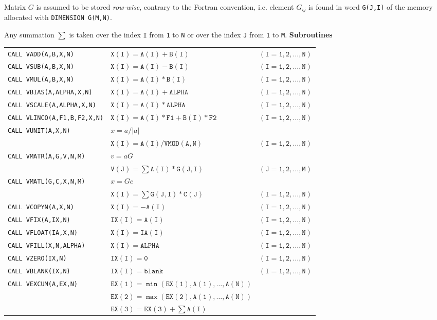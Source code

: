 Matrix $G$ is assumed to be stored {\it row-wise},
contrary to the Fortran convention, i.e. element $G_{ij}$ is
found in word {\tt G(J,I)} of the memory allocated with
{\tt DIMENSION G(M,N)}.
\par
Any summation $\sum$ is taken
over the index {\tt I} from {\tt 1} to {\tt N} or
over the index {\tt J} from {\tt 1} to {\tt M}.
\newpage
{\bf Subroutines} \\[3mm]
\begin{tabular}{@{\hspace*{10mm}}lll}
{\tt CALL VADD(A,B,X,N)}             & $\mathtt{X(I)=A(I)+B(I)}$
& $\mathtt{(I=1,2,\ldots,N)}$ \\
{\tt CALL VSUB(A,B,X,N)}             & $\mathtt{X(I)=A(I)-B(I)}$
& $\mathtt{(I=1,2,\ldots,N)}$ \\
{\tt CALL VMUL(A,B,X,N)}             & $\mathtt{X(I)=A(I)*B(I)}$
& $\mathtt{(I=1,2,\ldots,N)}$ \\
{\tt CALL VBIAS(A,ALPHA,X,N)}         & $\mathtt{X(I)=A(I)+ALPHA}$
& $\mathtt{(I=1,2,\ldots,N)}$ \\
{\tt CALL VSCALE(A,ALPHA,X,N)}         & $\mathtt{X(I)=A(I)*ALPHA}$
& $\mathtt{(I=1,2,\ldots,N)}$ \\
{\tt CALL VLINCO(A,F1,B,F2,X,N)} & $\mathtt{X(I)=A(I)*F1+B(I)*F2}$
& $\mathtt{(I=1,2,\ldots,N)}$ \\
{\tt CALL VUNIT(A,X,N)}               & $x = a / |a|$ \\
                                      & $\mathtt{X(I)=A(I)/VMOD(A,N)}$
& $\mathtt{(I=1,2,\ldots,N)}$ \\
{\tt CALL VMATR(A,G,V,N,M)}    & $v = aG$ \\
                               & $\mathtt{V(J)= \sum A(I)*G(J,I)}$
& $\mathtt{(J=1,2,\ldots,M)}$ \\
{\tt CALL VMATL(G,C,X,N,M)}    & $x = Gc$ \\
                               & $\mathtt{X(I)= \sum G(J,I)*C(J)}$
& $\mathtt{(I=1,2,\ldots,N)}$ \\
{\tt CALL VCOPYN(A,X,N)}               & $\mathtt{X(I)=-A(I)}$
& $\mathtt{(I=1,2,\ldots,N)}$ \\
{\tt CALL VFIX(A,IX,N)}              & $\mathtt{IX(I)=A(I)}$
& $\mathtt{(I=1,2,\ldots,N)}$ \\
{\tt CALL VFLOAT(IA,X,N)}            & $\mathtt{X(I)=IA(I)}$
& $\mathtt{(I=1,2,\ldots,N)}$ \\
{\tt CALL VFILL(X,N,ALPHA)}          & $\mathtt{X(I)=ALPHA}$
& $\mathtt{(I=1,2,\ldots,N)}$ \\
{\tt CALL VZERO(IX,N)}                & $\mathtt{IX(I)=0}$
& $\mathtt{(I=1,2,\ldots,N)}$ \\
{\tt CALL VBLANK(IX,N)}               & $\mathtt{IX(I)=blank}$
& $\mathtt{(I=1,2,\ldots,N)}$ \\
{\tt CALL VEXCUM(A,EX,N)}              &
  $\mathtt{EX(1)=\min (EX(1),A(1),\ldots,A(N))}$ & \\
& $\mathtt{EX(2)=\max (EX(2),A(1),\ldots,A(N))}$ & \\
& $\mathtt{EX(3)=EX(3)+\sum A(I)}$
\end{tabular} \\[3mm]
